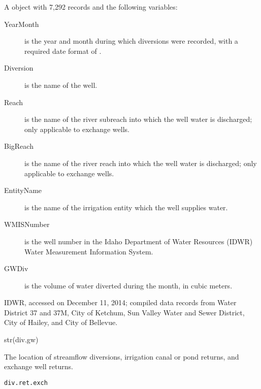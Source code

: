 \documentclass[letterpaper]{book}
\begin{document}
\begin{Format}
A  object with 7,292 records and the following variables:
\begin{description}

\item[YearMonth] is the year and month during which diversions were recorded, with a required date format of .
\item[Diversion] is the name of the well.
\item[Reach] is the name of the river subreach into which the well water is discharged; only applicable to exchange wells.
\item[BigReach] is the name of the river reach into which the well water is discharged; only applicable to exchange wells.
\item[EntityName] is the name of the irrigation entity which the well supplies water.
\item[WMISNumber] is the well number in the Idaho Department of Water Resources (IDWR) Water Measurement Information System.
\item[GWDiv] is the volume of water diverted during the month, in cubic meters.

\end{description}

\end{Format}
%
\begin{Source}\relax
IDWR, accessed on December 11, 2014;
compiled data records from Water District 37 and 37M, City of Ketchum, Sun Valley Water and Sewer District, City of Hailey, and City of Bellevue.
\end{Source}
%
\begin{Examples}
\begin{ExampleCode}
str(div.gw)
\end{ExampleCode}
\end{Examples}
%
\begin{Description}\relax
The location of streamflow diversions, irrigation canal or pond returns, and exchange well returns.
\end{Description}
%
\begin{Usage}
\begin{verbatim}
div.ret.exch
\end{verbatim}
\end{Usage}
%
\end{document}
